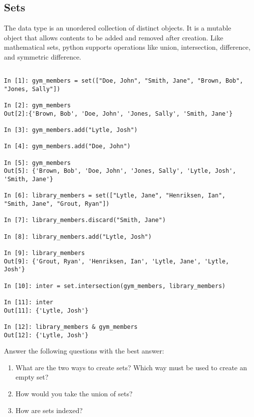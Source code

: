 \subsection*{Sets}
\begin{example}

The  data type is an unordered collection of distinct objects. 
It is a mutable object that allows contents to be added and removed after creation. 
Like mathematical sets, python supports operations like union, intersection, 
difference, and symmetric difference. 

\begin{lstlisting}

In [1]: gym_members = set(["Doe, John", "Smith, Jane", "Brown, Bob", "Jones, Sally"])

In [2]: gym_members
Out[2]:{'Brown, Bob', 'Doe, John', 'Jones, Sally', 'Smith, Jane'}

In [3]: gym_members.add("Lytle, Josh")

In [4]: gym_members.add("Doe, John")

In [5]: gym_members
Out[5]: {'Brown, Bob', 'Doe, John', 'Jones, Sally', 'Lytle, Josh', 'Smith, Jane'}

In [6]: library_members = set(["Lytle, Jane", "Henriksen, Ian", "Smith, Jane", "Grout, Ryan"])

In [7]: library_members.discard("Smith, Jane")

In [8]: library_members.add("Lytle, Josh") 

In [9]: library_members
Out[9]: {'Grout, Ryan', 'Henriksen, Ian', 'Lytle, Jane', 'Lytle, Josh'}

In [10]: inter = set.intersection(gym_members, library_members)

In [11]: inter
Out[11]: {'Lytle, Josh'}

In [12]: library_members & gym_members
Out[12]: {'Lytle, Josh'}

\end{lstlisting}
\end{example}

\begin{problem}
Answer the following questions with the best answer:
\begin{enumerate}
\item What are the two ways to create sets? Which way must be used to 
create an empty set?
\item How would you take the union of sets?
\item How are sets indexed?

\end{enumerate}
\end{problem}

